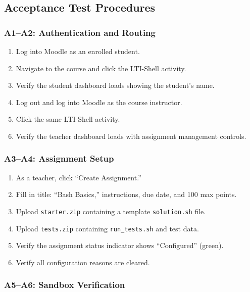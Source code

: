 \documentclass[12pt, letterpaper]{article}
\begin{document}
\subsection{Acceptance Test Procedures}

\subsubsection{A1--A2: Authentication and Routing}

\begin{enumerate}
    \item Log into Moodle as an enrolled student.
    \item Navigate to the course and click the LTI-Shell activity.
    \item Verify the student dashboard loads showing the student's name.
    \item Log out and log into Moodle as the course instructor.
    \item Click the same LTI-Shell activity.
    \item Verify the teacher dashboard loads with assignment management controls.
\end{enumerate}

\subsubsection{A3--A4: Assignment Setup}

\begin{enumerate}
    \item As a teacher, click ``Create Assignment.''
    \item Fill in title: ``Bash Basics,'' instructions, due date, and 100 max points.
    \item Upload \texttt{starter.zip} containing a template \texttt{solution.sh} file.
    \item Upload \texttt{tests.zip} containing \texttt{run\_tests.sh} and test data.
    \item Verify the assignment status indicator shows ``Configured'' (green).
    \item Verify all configuration reasons are cleared.
\end{enumerate}

\subsubsection{A5--A6: Sandbox Verification}
\end{document}
